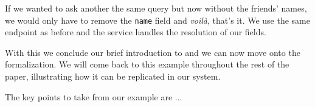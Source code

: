 If we wanted to ask another the same query but now without the friends' names, we would only have to remove the \texttt{name} field and \textit{voilà}, that's it. We use the same endpoint as before and the \gql service handles the resolution of our fields.

With this we conclude our brief introduction to \gql and we can now move onto the formalization. We will come back to this example throughout the rest of the paper, illustrating how it can be replicated in our system.

The key points to take from our example are ...
